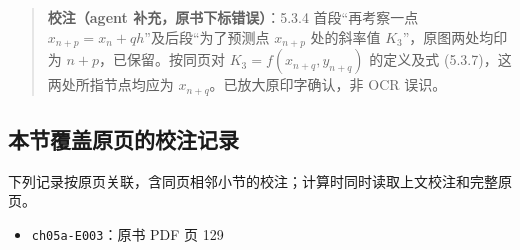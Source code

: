 \documentclass[
  10pt,
  fontset=fandol]{ctexart}
\providecommand{\tightlist}{%
  \setlength{\itemsep}{0pt}\setlength{\parskip}{0pt}}
\begin{document}
\begin{quote}
\textbf{校注（agent 补充，原书下标错误）}：5.3.4 首段``再考察一点 \(x_{n+p}=x_n+qh\)''及后段``为了预测点 \(x_{n+p}\) 处的斜率值 \(K_3\)''，原图两处均印为 \(n+p\)，已保留。按同页对 \(K_3=f(x_{n+q},y_{n+q})\) 的定义及式 (5.3.7)，这两处所指节点均应为 \(x_{n+q}\)。已放大原印字确认，非 OCR 误识。
\end{quote}

\subsection{本节覆盖原页的校注记录}\label{ux672cux8282ux8986ux76d6ux539fux9875ux7684ux6821ux6ce8ux8bb0ux5f55}

下列记录按原页关联，含同页相邻小节的校注；计算时同时读取上文校注和完整原页。

\begin{itemize}
\tightlist
\item
  \texttt{ch05a-E003}：原书 PDF 页 129
\end{itemize}
\end{document}
